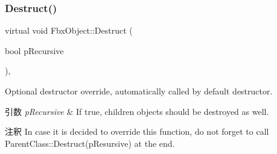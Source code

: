\subsubsection{\texorpdfstring{Destruct()}{Destruct()}}
{\footnotesize\ttfamily virtual void Fbx\+Object\+::\+Destruct (\begin{DoxyParamCaption}\item[{bool}]{p\+Recursive }\end{DoxyParamCaption})\hspace{0.3cm}{\ttfamily [protected]}, {\ttfamily [virtual]}}

Optional destructor override, automatically called by default destructor. 
\begin{DoxyParams}{引数}
{\em p\+Recursive} & If true, children objects should be destroyed as well. \\
\hline
\end{DoxyParams}
\begin{DoxyRemark}{注釈}
In case it is decided to override this function, do not forget to call Parent\+Class\+::\+Destruct(p\+Resursive) at the end. 
\end{DoxyRemark}


